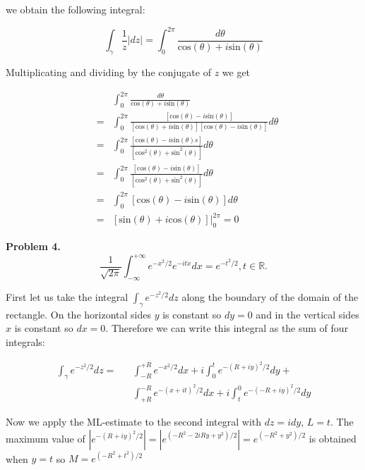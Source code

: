 \documentclass[letterpaper,twoside,11pt]{article}
\begin{document}
\begin{enumerate}[a)]
we obtain the following integral:

\begin{equation}
\int_{\gamma} \frac{1}{z}|dz| = \int_{0}^{2\pi} \frac{d\theta}{\text{cos}(\theta)+i\text{sin}(\theta)} \nonumber
\end{equation}

Multiplicating and dividing by the conjugate of $z$ we get

\begin{eqnarray}
&&\int_{0}^{2\pi} \frac{d\theta}{\text{cos}(\theta)+i\text{sin}(\theta)} \nonumber
\\&=& \int_{0}^{2\pi} \frac{[\text{cos}(\theta)-i\text{sin}(\theta)]}{[\text{cos}(\theta)+i\text{sin}(\theta)][\text{cos}(\theta)-i\text{sin}(\theta)]}d\theta \nonumber
\\&=& \int_{0}^{2\pi} \frac{[\text{cos}(\theta)-i\text{sin}(\theta)s]}{[\text{cos}^2(\theta)+\text{sin}^2(\theta)]}d\theta \nonumber
\\&=& \int_{0}^{2\pi} \frac{[\text{cos}(\theta)-i\text{sin}(\theta)]}{[\text{cos}^2(\theta)+\text{sin}^2(\theta)]}d\theta \nonumber
\\&=& \int_{0}^{2\pi} [\text{cos}(\theta)-i\text{sin}(\theta)]d\theta \nonumber
\\&=& [\text{sin}(\theta)+i\text{cos}(\theta)]\bigg\vert_{0}^{2\pi}= 0\nonumber
\end{eqnarray}

\newpage
\textbf{Problem 4.}
\begin{equation}
\frac{1}{\sqrt{2\pi}}\int_{-\infty}^{+\infty} e^{-x^2/2}e^{-itx}dx= e^{-t^2/2}, t \in \mathbb{R} \nonumber.
\end{equation}

First let us take the integral $\int_{\gamma} e^{-z^2/2}dz$ along the boundary of the domain of the rectangle. On the horizontal sides $y$ is constant so $dy=0$ and in the vertical sides $x$ is constant so $dx=0$. Therefore we can write this integral as the sum of four integrals:

\begin{eqnarray}
\int_{\gamma} e^{-z^2/2}dz=&&\int_{-R}^{+R} e^{-x^2/2}dx + i\int_{0}^{t} e^{-(R+iy)^2/2}dy +\nonumber
\\&&\int_{+R}^{-R} e^{-(x+it)^2/2}dx+i\int_{t}^{0} e^{-(-R+iy)^2/2}dy \nonumber
\end{eqnarray}

Now we apply the ML-estimate to the second integral with $dz=idy$, $L=t$. The maximum value of $|e^{-(R+iy)^2/2}|=|e^{(-R^2-2iRy+y^2)/2}|=e^{(-R^2+y^2)/2}$ is obtained when $y=t$ so $M = e^{(-R^2+t^2)/2}$


\end{enumerate}
\end{document}
